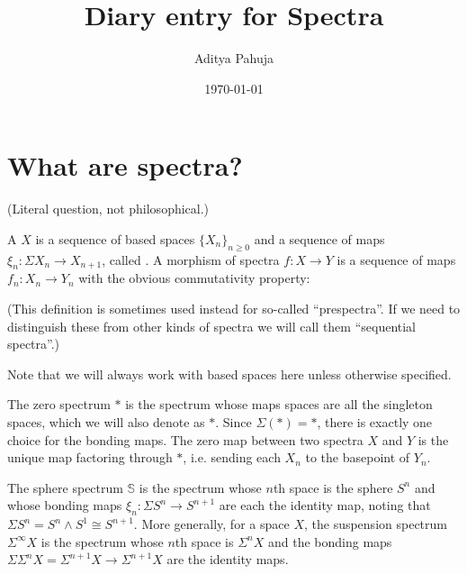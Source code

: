 \documentclass[10pt]{article}
\title{Diary entry for Spectra}
\author{Aditya Pahuja}
\date{\today}
\begin{document}
\maketitle
\tableofcontents
\pagebreak

\section{What are spectra?}
(Literal question, not philosophical.)
\begin{definition}[Spectrum]
    \label{def:spectrum}
    A  $X$ is a sequence of based spaces $\{X_n\}_{n\ge0}$
    and a sequence of maps $\xi_n\colon\Sigma X_n\to X_{n+1}$,
    called . A morphism of spectra
    $f\colon X\to Y$ is a sequence of maps $f_n\colon X_n\to Y_n$
    with the obvious commutativity property:
    \begin{center}
    \end{center}
    (This definition is sometimes used instead for so-called ``prespectra''.
    If we need to distinguish these from other kinds of spectra
    we will call them ``sequential spectra''.)
\end{definition}
Note that we will always work with based spaces here
unless otherwise specified.

\begin{example}
    \label{ex:zero-spectrum}
    The zero spectrum $*$ is the spectrum whose maps
    spaces are all the singleton spaces, which we will also denote as $*$.
    Since $\Sigma(*) = *$, there is exactly one choice for the bonding maps.
    The zero map between two spectra $X$ and $Y$
    is the unique map factoring through $*$,
    i.e. sending each $X_n$ to the basepoint of $Y_n$.
\end{example}

\begin{example}
    \label{ex:suspension-spectrum}
    The sphere spectrum $\mathbb S$ is the spectrum
    whose $n$th space is the sphere $S^n$
    and whose bonding maps $\xi_n\colon \Sigma S^n\to S^{n+1}$
    are each the identity map, noting that
    $\Sigma S^n = S^n\wedge S^1 \cong S^{n+1}$.
    More generally, for a space $X$, the suspension spectrum
    $\Sigma^\infty X$ is the spectrum whose $n$th space is
    $\Sigma^n X$ and the bonding maps
    $\Sigma\Sigma^n X = \Sigma^{n+1}X\to \Sigma^{n+1}X$ are the identity maps.
\end{example}
\end{document}
